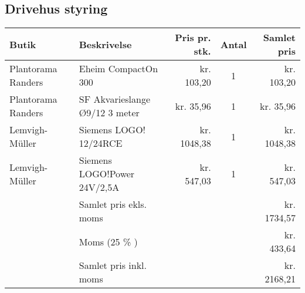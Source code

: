\subsection{Drivehus styring}
\begin{tabular}[c]{|l|l|r|c|r|}
    \hline
    Butik & Beskrivelse & Pris pr. stk. & Antal & Samlet pris \\
    \hline \hline
    Plantorama Randers & Eheim CompactOn 300 &  kr. 103,20 & 1 & kr. 103,20 \\
    \hline
    Plantorama Randers & SF Akvarieslange Ø9/12 3 meter & kr. 35,96 & 1 & kr. 35,96 \\
    \hline
    Lemvigh-Müller & Siemens LOGO! 12/24RCE & kr. 1048,38 & 1 & kr. 1048,38 \\
    \hline
    Lemvigh-Müller & Siemens LOGO!Power 24V/2,5A &  kr. 547,03 & 1 & kr. 547,03 \\
    \hline
                    & Samlet pris ekls. moms &  & & kr. 1734,57 \\
                    & Moms (25 \% ) & & & kr. 433,64 \\
                    & Samlet pris inkl. moms & & & kr. 2168,21 \\
                    \hline

\end{tabular}